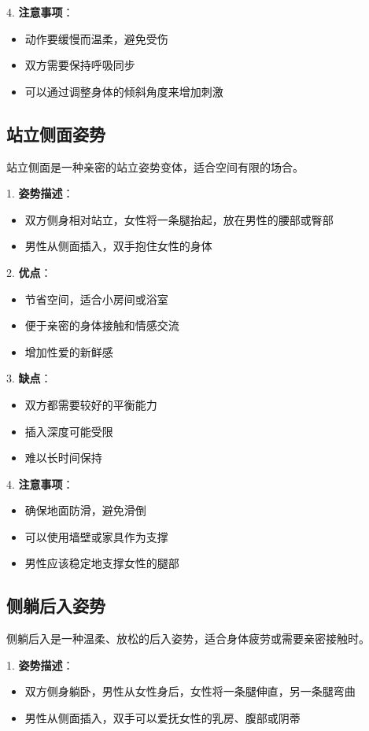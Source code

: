 \documentclass[12pt,UTF8]{ctexbook}
\begin{document}
4. \textbf{注意事项}：
  \begin{itemize}
  \item 动作要缓慢而温柔，避免受伤
  \item 双方需要保持呼吸同步
  \item 可以通过调整身体的倾斜角度来增加刺激
  \end{itemize}

\subsection{站立侧面姿势}

站立侧面是一种亲密的站立姿势变体，适合空间有限的场合。

1. \textbf{姿势描述}：
  \begin{itemize}
  \item 双方侧身相对站立，女性将一条腿抬起，放在男性的腰部或臀部
  \item 男性从侧面插入，双手抱住女性的身体
  \end{itemize}

2. \textbf{优点}：
  \begin{itemize}
  \item 节省空间，适合小房间或浴室
  \item 便于亲密的身体接触和情感交流
  \item 增加性爱的新鲜感
  \end{itemize}

3. \textbf{缺点}：
  \begin{itemize}
  \item 双方都需要较好的平衡能力
  \item 插入深度可能受限
  \item 难以长时间保持
  \end{itemize}

4. \textbf{注意事项}：
  \begin{itemize}
  \item 确保地面防滑，避免滑倒
  \item 可以使用墙壁或家具作为支撑
  \item 男性应该稳定地支撑女性的腿部
  \end{itemize}

\subsection{侧躺后入姿势}

侧躺后入是一种温柔、放松的后入姿势，适合身体疲劳或需要亲密接触时。

1. \textbf{姿势描述}：
  \begin{itemize}
  \item 双方侧身躺卧，男性从女性身后，女性将一条腿伸直，另一条腿弯曲
  \item 男性从侧面插入，双手可以爱抚女性的乳房、腹部或阴蒂
  \end{itemize}
\end{document}
